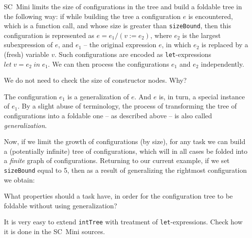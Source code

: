 SC~Mini limits the size of configurations in the tree and build a foldable tree in the following way:
if while building the tree a configuration $e$ is encountered, 
which is a function call,
and whose size is greater than \texttt{sizeBound},
then this configuration is represented as $e = e_1 / (v := e_2)$, 
where $e_2$ is the largest subexpression of $e$, and $e_1$ -- 
the original expression $e$, in which $e_2$ is replaced by a (fresh) variable $v$.
Such configurations are encoded as \texttt{let}-expressions $let\;v = e_2 \;in \;e_1$.
We can then process the configurations $e_1$ and $e_2$ independently.

\begin{exercise}
We do not need to check the size of constructor nodes. Why?
\end{exercise}

The configuration $e_1$ is a generalization of $e$. 
And $e$ is, in turn, a special instance of $e_1$.
By a slight abuse of terminology, the process of transforming the
tree of configurations into a foldable one -- as described above --
is also called \emph{generalization}.

Now, if we limit the growth of configurations (by size),
for any task we can build a (potentially infinite) tree of configurations,
which will in all cases be folded into a \emph{finite} graph of configurations.
Returning to our current example, if we set \texttt{sizeBound} equal to 5, then as
a result of generalizing the rightmost configuration we obtain:\\


\begin{exercise} 
What properties should a task have, in order for the configuration
tree to be foldable without using generalization?
\end{exercise}

\begin{exercise}
It is very easy to extend \texttt{intTree} with treatment of \texttt{let}-expressions.
Check how it is done in the SC~Mini sources.
\end{exercise}

